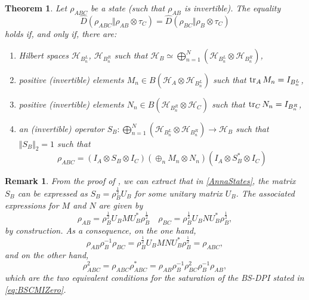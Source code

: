 \documentclass[11pt]{article}
\theoremstyle{newdefinition}
\theoremstyle{newplain}
\newtheorem{theorem}[definition]{Theorem}
\newtheorem{remark}[definition]{Remark}
\theoremstyle{myplain}
\DeclareMathOperator{\1}{\mathds{1}}
\begin{document}
\begin{theorem}\label{theo:StructureBSDPI}
    Let $\rho_{ABC}$ be a state (such that $\rho_{AB}$ is invertible). The equality
    \begin{equation}
        \widehat{D}(\rho_{ABC}\Vert \rho_{AB}\otimes \tau_C)=\widehat{D}(\rho_{BC}\Vert \rho_B \otimes \tau_C)
    \end{equation}
    holds if, and only if, there are:
    \begin{enumerate}[label=(\roman*)]
        \item Hilbert spaces $\mathcal{H}_{B_n^L}$, $\mathcal{H}_{B_n^R}$ such that $\displaystyle \mathcal{H}_B \simeq \bigoplus_{n=1}^N\left( \mathcal{H}_{B_n^L} \otimes \mathcal{H}_{B_n^R}\right)$,\\
        \item \label{theo:Condition2} positive (invertible) elements $M_n \in B\left(\mathcal{H}_A \otimes \mathcal{H}_{B_n^L}\right)$ such that $\tr_A M_n=I_{B_n^L}$,\\
        \item \label{theo:Condition3} positive (invertible) elements $N_n \in B\left( \mathcal{H}_{B_n^R}\otimes \mathcal{H}_C \right)$ such that $\tr_C N_n=I_{B_n^R}$,
        \item an (invertible) operator $S_B:\bigoplus_{n=1}^N \left( \mathcal{H}_{B_n^L} \otimes \mathcal{H}_{B_n^R}\right) \to \mathcal{H}_B$ such that $\Vert S_B \Vert_2=1$ such that
        \begin{equation}\label{AnnaStates}
            \rho_{ABC}=(I_A \otimes S_B \otimes I_C)(\oplus_n M_n \otimes N_n)(I_A\otimes S_B^*\otimes I_C)
        \end{equation}
    \end{enumerate}
\end{theorem}


\begin{remark} \label{rem:from-decomposition-to-map}
From the proof of 
, we can extract that in \eqref{AnnaStates}, the matrix $S_B$ can be expressed as $S_B=\rho_B^{\frac{1}{2}}U_B$ for some unitary matrix $U_B$. The associated expressions for $M$ and $N$ are given by
\begin{equation}
   \rho_{AB}=\rho_B^{\frac{1}{2}}U_BMU_B^*\rho_B^{\frac{1}{2}} \quad \rho_{BC}=\rho_B^{\frac{1}{2}}U_BNU_B^*\rho_B^{\frac{1}{2}},
\end{equation}
by construction. As a consequence, on the one hand,
\begin{equation}
    \rho_{AB}\rho_{B}^{-1}\rho_{BC}=\rho_B^{\frac{1}{2}}U_BM N U_B^*\rho_B^{\frac{1}{2}}=\rho_{ABC},
\end{equation}
and on the other hand,
\begin{equation}
\rho_{ABC}^2=\rho_{ABC}\rho_{ABC}^*=\rho_{AB}\rho_{B}^{-1}\rho_{BC}^2\rho_B^{-1}\rho_{AB},
\end{equation}
which are the two equivalent conditions for the saturation of the BS-DPI stated in \eqref{eq:BSCMIZero}.
\end{remark}
\end{document}
